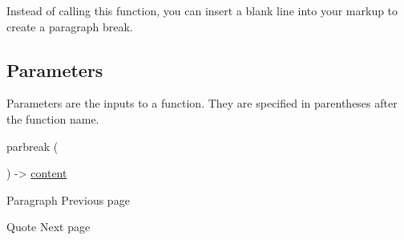Instead of calling this function, you can insert a blank line into your
markup to create a paragraph break.

\subsection{\texorpdfstring{{ Parameters
}}{ Parameters }}\label{parameters}

\label{parameters-tooltip}
Parameters are the inputs to a function. They are specified in
parentheses after the function name.

{ parbreak } (

) -\textgreater{} \href{/docs/reference/foundations/content/}{content}

\href{/docs/reference/model/par/}{\pandocbounded{}}

{ Paragraph } { Previous page }

\href{/docs/reference/model/quote/}{\pandocbounded{}}

{ Quote } { Next page }
